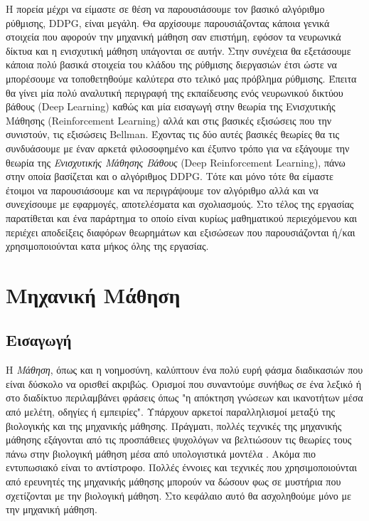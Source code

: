 \documentclass[11pt]{article} %
\numberwithin{equation}{subsection}
\begin{document}
Η πορεία μέχρι να είμαστε σε θέση να παρουσιάσουμε τον βασικό αλγόριθμο ρύθμισης, DDPG, είναι μεγάλη. Θα αρχίσουμε παρουσιάζοντας κάποια γενικά στοιχεία που αφορούν την μηχανική μάθηση σαν επιστήμη, εφόσον τα νευρωνικά δίκτυα και η ενισχυτική μάθηση υπάγονται σε αυτήν. Στην συνέχεια θα εξετάσουμε κάποια πολύ βασικά στοιχεία του κλάδου της ρύθμισης διεργασιών έτσι ώστε να μπορέσουμε να τοποθετηθούμε καλύτερα στο τελικό μας πρόβλημα ρύθμισης. Έπειτα θα γίνει μία πολύ αναλυτική περιγραφή της εκπαίδευσης ενός νευρωνικού δικτύου βάθους (Deep Learning) καθώς και μία εισαγωγή στην θεωρία της Ενισχυτικής Μάθησης (Reinforcement Learning) αλλά και στις βασικές εξισώσεις που την συνιστούν, τις εξισώσεις Bellman. Έχοντας τις δύο αυτές βασικές θεωρίες θα τις συνδυάσουμε με έναν αρκετά φιλοσοφημένο και έξυπνο τρόπο για να εξάγουμε την θεωρία της \textit{Ενισχυτικής Μάθησης Βάθους} (Deep Reinforcement Learning), πάνω στην οποία βασίζεται και ο αλγόριθμος DDPG. Τότε και μόνο τότε θα είμαστε έτοιμοι να παρουσιάσουμε και να περιγράψουμε τον αλγόριθμο αλλά και να συνεχίσουμε με εφαρμογές, αποτελέσματα και σχολιασμούς. Στο τέλος της εργασίας παρατίθεται και ένα παράρτημα το οποίο είναι κυρίως μαθηματικού περιεχόμενου και περιέχει αποδείξεις διαφόρων θεωρημάτων και εξισώσεων που παρουσιάζονται ή/και χρησιμοποιούνται κατα μήκος όλης της εργασίας. 

\newpage

\section{Μηχανική Μάθηση}

\subsection{Εισαγωγή}


Η \textit{Μάθηση}, όπως και η νοημοσύνη, καλύπτουν ένα πολύ ευρή φάσμα διαδικασιών που είναι δύσκολο να ορισθεί ακριβώς. Ορισμοί που συναντούμε συνήθως σε ένα λεξικό ή στο διαδίκτυο περιλαμβάνει φράσεις όπως "η απόκτηση γνώσεων και ικανοτήτων μέσα από μελέτη, οδηγίες ή εμπειρίες". Υπάρχουν αρκετοί παραλληλισμοί μεταξύ της βιολογικής και της μηχανικής μάθησης. Πράγματι, πολλές τεχνικές της μηχανικής μάθησης εξάγονται από τις προσπάθειες ψυχολόγων να βελτιώσουν τις θεωρίες τους πάνω στην βιολογική μάθηση μέσα από υπολογιστικά μοντέλα \cite{machinelearning1}. Ακόμα πιο εντυπωσιακό είναι το αντίστροφο. Πολλές έννοιες και τεχνικές που χρησιμοποιούνται από ερευνητές της μηχανικής μάθησης μπορούν να δώσουν φως σε μυστήρια που σχετίζονται με την βιολογική μάθηση. Στο κεφάλαιο αυτό θα ασχοληθούμε μόνο με την μηχανική μάθηση.\\
\end{document}
